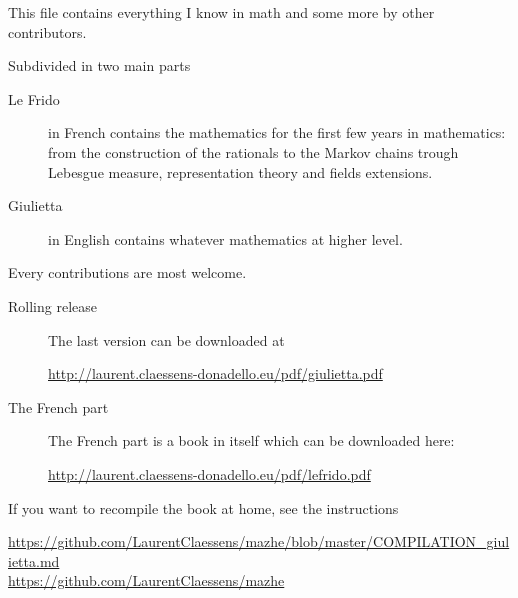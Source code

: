 
\thispagestyle{empty}

This file contains everything I know in math and some more by other contributors.

Subdivided in two main parts
\begin{description}
	\item[Le Frido] in French contains the mathematics for the first few years in mathematics: from the construction of the rationals to the Markov chains trough Lebesgue measure, representation theory and fields extensions.
	\item[Giulietta] in English contains whatever mathematics at higher level.
\end{description}

\begin{center}
	Every contributions are most welcome.
\end{center}

\vfill

\begin{description}
	\item[Rolling release]

	      The last version can be downloaded at
	      \begin{center}
		      \url{http://laurent.claessens-donadello.eu/pdf/giulietta.pdf}
	      \end{center}

	\item[The French part]
	      The French part is a book in itself which can be downloaded here:
	      \begin{center}
		      \url{http://laurent.claessens-donadello.eu/pdf/lefrido.pdf}
	      \end{center}

\end{description}

If you want to recompile the book at home, see the instructions
\begin{center}
	\url{https://github.com/LaurentClaessens/mazhe/blob/master/COMPILATION_giulietta.md}\\
	\url{https://github.com/LaurentClaessens/mazhe}
\end{center}

